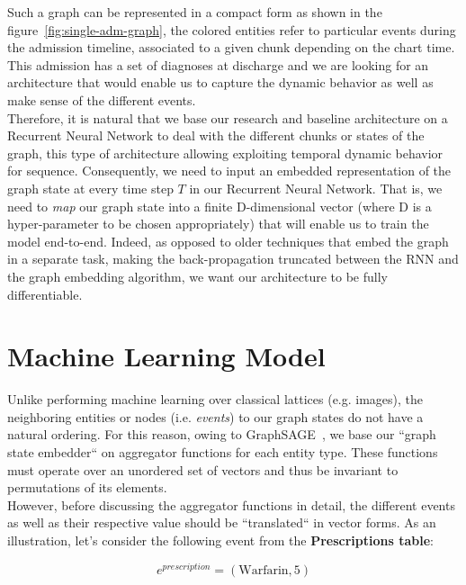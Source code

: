Such a graph can be represented in a compact form as shown in the figure~\ref{fig:single-adm-graph}, the colored entities refer to particular events during the admission timeline, associated to a given chunk depending on the chart time. This admission has a set of diagnoses at discharge and we are looking for an architecture that would enable us to capture the dynamic behavior as well as make sense of the different events. \\

Therefore, it is natural that we base our research and baseline architecture on a Recurrent Neural Network to deal with the different chunks or states of the graph, this type of architecture allowing exploiting temporal dynamic behavior for sequence. Consequently, we need to input an embedded representation of the graph state at every time step $T$ in our Recurrent Neural Network. That is, we need to \textit{map} our graph state into a finite D-dimensional vector (where D is a hyper-parameter to be chosen appropriately) that will enable us to train the model end-to-end. Indeed, as opposed to older techniques that embed the graph in a separate task, making the back-propagation truncated between the RNN and the graph embedding algorithm, we want our architecture to be fully differentiable. \\

\section{Machine Learning Model}
Unlike performing machine learning over classical lattices (e.g. images), the neighboring entities or nodes (i.e. \textit{events}) to our graph states do not have a natural ordering. For this reason, owing to GraphSAGE~\cite{DBLP:journals/corr/HamiltonYL17}, we base our ``graph state embedder`` on aggregator functions for each entity type. These functions must operate over an unordered set of vectors and thus be invariant to permutations of its elements. \\

However, before discussing the aggregator functions in detail, the different events as well as their respective value should be ``translated`` in vector forms. As an illustration, let's consider the following event from the \textbf{Prescriptions table}:

\begin{equation*}
 e^{prescription} = (\mbox{Warfarin}, 5)
\end{equation*}

